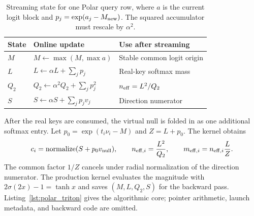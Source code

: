 \begin{table}[!ht]
\centering
\small
\begin{tabular}{lll}
\toprule
\textbf{State} & \textbf{Online update} & \textbf{Use after streaming} \\
\midrule
$M$ & $M\leftarrow\max(M,\max a)$ & Stable common logit origin \\
$L$ & $L\leftarrow\alpha L+\sum_jp_j$ & Real-key softmax mass \\
$Q_2$ & $Q_2\leftarrow\alpha^2Q_2+\sum_jp_j^2$ & $n_{\rm eff}=L^2/Q_2$ \\
$S$ & $S\leftarrow\alpha S+\sum_jp_jv_j$ & Direction numerator \\
\bottomrule
\end{tabular}
\caption{Streaming state for one Polar query row, where $a$ is the current logit block and $p_j=\exp(a_j-M_{\rm new})$. The squared accumulator must rescale by $\alpha^2$.}
\label{table:polar_streaming_state}
\end{table}

After the real keys are consumed, the virtual null is folded in as one additional softmax entry. Let $p_0=\exp(t_i\nu_i-M)$ and $Z=L+p_0$. The kernel obtains
\begin{equation}
c_i=\operatorname{normalize}(S+p_0v_{\rm null}),\qquad
n_{{\rm eff},i}=\frac{L^2}{Q_2},\qquad
m_{{\rm eff},i}=n_{{\rm eff},i}\frac{L}{Z}.
\end{equation}
The common factor $1/Z$ cancels under radial normalization of the direction numerator. The production kernel evaluates the magnitude with $2\sigma(2x)-1=\tanh x$ and saves $(M,L,Q_2,S)$ for the backward pass. Listing~\ref{lst:polar_triton} gives the algorithmic core; pointer arithmetic, launch metadata, and backward code are omitted.

